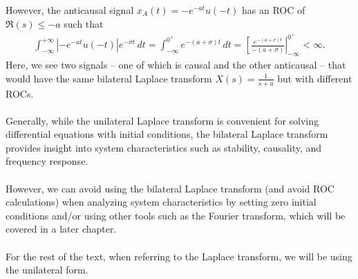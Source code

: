 \documentclass{report}
\begin{document}
However, the anticausal signal $x_{A}(t)= -e^{-at}u(-t)$ has an ROC of $\Re(s)\leq -a$ such that 
\begin{align*}
    \int_{-\infty}^{+\infty} |-e^{-at}u(-t)|e^{-\sigma t} \,dt = \int_{-\infty}^{0^+} e^{-(a+\sigma)t} \,dt = \left[\frac{e^{-(a+\sigma) t}}{-(a+\sigma)}\right|_{-\infty}^{0^+} < \infty.
\end{align*}
Here, we see two signals -- one of which is causal and the other anticausal -- that would have the same bilateral Laplace transform $X(s)=\frac{1}{s+a}$ but with 
different ROCs.
\\ \\
Generally, while the unilateral Laplace transform is convenient for solving differential equations with initial conditions, the bilateral Laplace transform provides insight into system characteristics 
such as stability, causality, and frequency response. 
\\ \\ 
However, we can avoid using the bilateral Laplace transform (and avoid ROC calculations) when analyzing system characteristics by setting zero initial conditions and/or using other 
tools such as the Fourier transform, which will be covered in a later chapter. 
\\ \\
For the rest of the text, when referring to the Laplace transform, we will be using the unilateral form.
\end{document}
